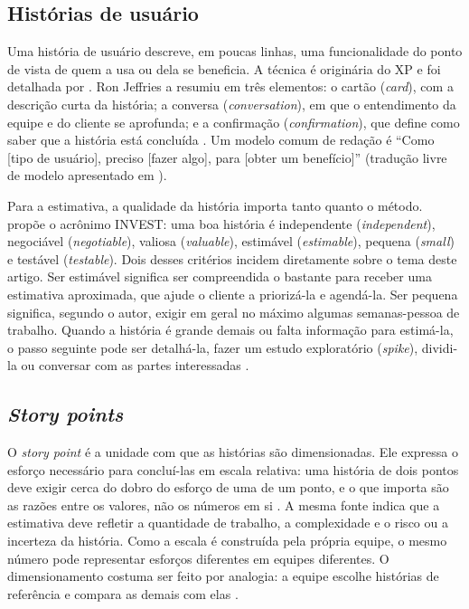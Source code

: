 
\subsection{Histórias de usuário}
\label{sub:historias}

Uma história de usuário descreve, em poucas linhas, uma funcionalidade do ponto
de vista de quem a usa ou dela se beneficia. A técnica é originária do XP
\cite{beck2004} e foi detalhada por . Ron Jeffries a
resumiu em três elementos: o cartão (\textit{card}), com a descrição curta da
história; a conversa (\textit{conversation}), em que o entendimento da equipe e
do cliente se aprofunda; e a confirmação (\textit{confirmation}), que define
como saber que a história está concluída \cite{mountaingoatstories}. Um modelo
comum de redação é ``Como [tipo de usuário], preciso [fazer algo], para [obter
um benefício]'' (tradução livre de modelo apresentado em
).

Para a estimativa, a qualidade da história importa tanto quanto o método.
 propõe o acrônimo INVEST: uma boa história é independente
(\textit{independent}), negociável (\textit{negotiable}), valiosa
(\textit{valuable}), estimável (\textit{estimable}), pequena (\textit{small}) e
testável (\textit{testable}). Dois desses critérios incidem diretamente sobre o
tema deste artigo. Ser estimável significa ser compreendida o bastante para
receber uma estimativa aproximada, que ajude o cliente a priorizá-la e
agendá-la. Ser pequena significa, segundo o autor, exigir em geral no máximo
algumas semanas-pessoa de trabalho. Quando a história é grande demais ou falta
informação para estimá-la, o passo seguinte pode ser detalhá-la, fazer um
estudo exploratório (\textit{spike}), dividi-la ou conversar com as partes
interessadas \cite{mountaingoatpoker}.

\subsection{\textit{Story points}}
\label{sub:storypoints}

O \textit{story point} é a unidade com que as histórias são dimensionadas. Ele
expressa o esforço necessário para concluí-las em escala relativa: uma história
de dois pontos deve exigir cerca do dobro do esforço de uma de um ponto, e o que
importa são as razões entre os valores, não os números em si
\cite{mountaingoatpoints}. A mesma fonte indica que a estimativa deve refletir
a quantidade de trabalho, a complexidade e o risco ou a incerteza da história.
Como a escala é construída pela própria equipe, o mesmo número pode representar
esforços diferentes em equipes diferentes. O dimensionamento costuma ser feito
por analogia: a equipe escolhe histórias de referência e compara as demais com
elas \cite{cohn2005}.

